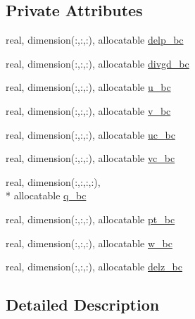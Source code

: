 \subsection*{Private Attributes}
\begin{DoxyCompactItemize}
\item 
real, dimension(\-:,\-:,\-:), allocatable \hyperlink{structfv__regional__mod_1_1fv__regional__bc__variables_aec9d5b732a9a4b2a90cdbf3401d36949}{delp\-\_\-bc}
\item 
real, dimension(\-:,\-:,\-:), allocatable \hyperlink{structfv__regional__mod_1_1fv__regional__bc__variables_ad0c85d1a488070404cc5f270a96f3952}{divgd\-\_\-bc}
\item 
real, dimension(\-:,\-:,\-:), allocatable \hyperlink{structfv__regional__mod_1_1fv__regional__bc__variables_a2e60aa07c8367405d53a19873475cf95}{u\-\_\-bc}
\item 
real, dimension(\-:,\-:,\-:), allocatable \hyperlink{structfv__regional__mod_1_1fv__regional__bc__variables_a92fb91ce17fc62b7556057210d6ba743}{v\-\_\-bc}
\item 
real, dimension(\-:,\-:,\-:), allocatable \hyperlink{structfv__regional__mod_1_1fv__regional__bc__variables_acf1748291fe067a0dab4227a4cb9bf02}{uc\-\_\-bc}
\item 
real, dimension(\-:,\-:,\-:), allocatable \hyperlink{structfv__regional__mod_1_1fv__regional__bc__variables_ad37018b4fe27728e568418120a8e8f3c}{vc\-\_\-bc}
\item 
real, dimension(\-:,\-:,\-:,\-:), \\*
allocatable \hyperlink{structfv__regional__mod_1_1fv__regional__bc__variables_ac742d67ec3f6444358668e8621f19096}{q\-\_\-bc}
\item 
real, dimension(\-:,\-:,\-:), allocatable \hyperlink{structfv__regional__mod_1_1fv__regional__bc__variables_aa401302803a6a0a83ed6fda6296b8c70}{pt\-\_\-bc}
\item 
real, dimension(\-:,\-:,\-:), allocatable \hyperlink{structfv__regional__mod_1_1fv__regional__bc__variables_a7aa826c4a7fd43cad4347d66ccd13b64}{w\-\_\-bc}
\item 
real, dimension(\-:,\-:,\-:), allocatable \hyperlink{structfv__regional__mod_1_1fv__regional__bc__variables_a0a8021dc9833cb86cabd577772baf258}{delz\-\_\-bc}
\end{DoxyCompactItemize}


\subsection{Detailed Description}


